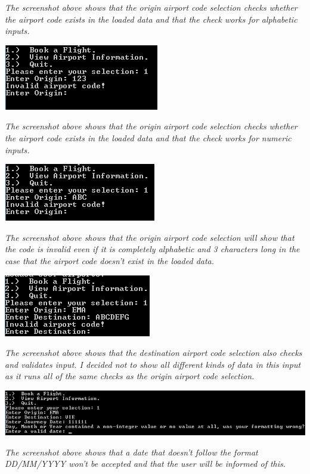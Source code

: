 \documentclass[10pt, a4paper]{article}
\begin{document}
\textit{The screenshot above shows that the origin airport code selection checks whether the airport code exists in the loaded data and that the check works for alphabetic inputs.}

\includegraphics{Validation4.png}

\textit{The screenshot above shows that the origin airport code selection checks whether the airport code exists in the loaded data and that the check works for numeric inputs.}

\includegraphics{Validation5.png}

\textit{The screenshot above shows that the origin airport code selection will show that the code is invalid even if it is completely alphabetic and 3 characters long in the case that the airport code doesn't exist in the loaded data.}

\includegraphics{Validation7.png}

\textit{The screenshot above shows that the destination airport code selection also checks and validates input. I decided not to show all different kinds of data in this input as it runs all of the same checks as the origin airport code selection.}

\includegraphics[scale=0.9]{Validation8.png}

\textit{The screenshot above shows that a date that doesn't follow the format DD/MM/YYYY won't be accepted and that the user will be informed of this.}
\end{document}
